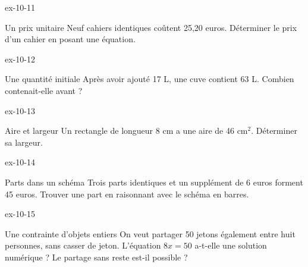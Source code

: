 \begin{blocLivre}{ex-10-11}\begin{exercice}[3]{Un prix unitaire}
Neuf cahiers identiques coûtent 25,20 euros. Déterminer le prix d’un cahier en posant une équation.
\end{exercice}\end{blocLivre}
\begin{blocLivre}{ex-10-12}\begin{exercice}[3]{Une quantité initiale}
Après avoir ajouté 17 L, une cuve contient 63 L. Combien contenait-elle avant ?
\end{exercice}\end{blocLivre}
\begin{blocLivre}{ex-10-13}\begin{exercice}[3]{Aire et largeur}
Un rectangle de longueur 8 cm a une aire de 46 cm$^2$. Déterminer sa largeur.
\label{fig-ex-10-13}
\end{exercice}\end{blocLivre}
\begin{blocLivre}{ex-10-14}\begin{exercice}[3]{Parts dans un schéma}
Trois parts identiques et un supplément de 6 euros forment 45 euros. Trouver une part en raisonnant avec le schéma en barres.
\label{fig-ex-10-14}
\end{exercice}\end{blocLivre}
\begin{blocLivre}{ex-10-15}\begin{exercice}[3]{Une contrainte d’objets entiers}
On veut partager 50 jetons également entre huit personnes, sans casser de jeton. L’équation $8x=50$ a-t-elle une solution numérique ? Le partage sans reste est-il possible ?
\end{exercice}\end{blocLivre}

\clearpage
